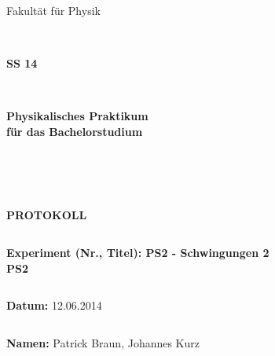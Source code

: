 \documentclass[12pt,a4paper]{article}
\begin{document}
\thispagestyle{empty}
			\begin{center}
			\Large{Fakultät für Physik}\\
			\end{center}
\begin{verbatim}


\end{verbatim}
			\begin{center}
			\textbf{\LARGE SS 14}
			\end{center}
\begin{verbatim}


\end{verbatim}
			\begin{center}
			\textbf{\LARGE{Physikalisches Praktikum\\ für das Bachelorstudium}}
			\end{center}
\begin{verbatim}




\end{verbatim}

			\begin{center}
			\textbf{\LARGE{PROTOKOLL}}
			\end{center}
			
\begin{verbatim}

\end{verbatim}

			\begin{flushleft}
			\textbf{\Large{Experiment (Nr., Titel): PS2 - Schwingungen 2}\\
			\LARGE{PS2}}	
			\end{flushleft}

\begin{verbatim}

\end{verbatim}	
			\begin{flushleft}
			\textbf{\Large{Datum:}} \Large{12.06.2014}
			\end{flushleft}
			
\begin{verbatim}
\end{verbatim}
		\begin{flushleft}
			\textbf{\Large{Namen:}} \Large{Patrick Braun, Johannes Kurz}
			\end{flushleft}
\end{document}
